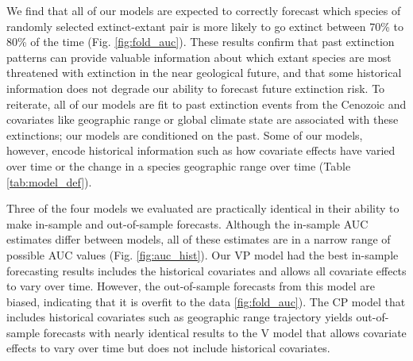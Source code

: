 \documentclass[12pt,letterpaper]{article}
\begin{document}
\begin{refsection}
We find that all of our models are expected to correctly forecast which species of randomly selected extinct-extant pair is more likely to go extinct between 70\% to 80\% of the time (Fig. \ref{fig:fold_auc}). These results confirm that past extinction patterns can provide valuable information about which extant species are most threatened with extinction in the near geological future, and that some historical information does not degrade our ability to forecast future extinction risk. To reiterate, all of our models are fit to past extinction events from the Cenozoic and covariates like geographic range or global climate state are associated with these extinctions; our models are conditioned on the past. Some of our models, however, encode historical information such as how covariate effects have varied over time or the change in a species geographic range over time (Table \ref{tab:model_def}). 

Three of the four models we evaluated are practically identical in their ability to make in-sample and out-of-sample forecasts. Although the in-sample AUC estimates differ between models, all of these estimates are in a narrow range of possible AUC values (Fig. \ref{fig:auc_hist}). Our VP model had the best in-sample forecasting results includes the historical covariates and allows all covariate effects to vary over time. However, the out-of-sample forecasts from this model are biased, indicating that it is overfit to the data \ref{fig:fold_auc}). The CP model that includes historical covariates such as geographic range trajectory yields out-of-sample forecasts with nearly identical results to the V model that allows covariate effects to vary over time but does not include historical covariates. 


\end{refsection}
\end{document}
